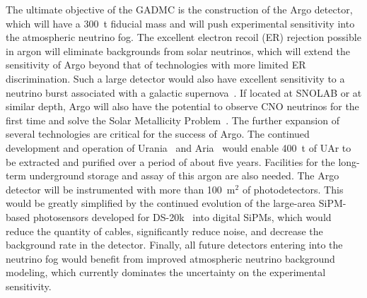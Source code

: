 The ultimate objective of the GADMC is the construction of the Argo detector, which will have a 300~t fiducial mass and will push experimental sensitivity into the atmospheric neutrino fog.  The excellent electron recoil (ER) rejection possible in argon will eliminate backgrounds from solar neutrinos, which will extend the sensitivity of Argo beyond that of technologies with more limited ER discrimination.  Such a large detector would also have excellent sensitivity to a neutrino burst associated with a galactic supernova~\cite{Agnes:2021ke}.  If located at SNOLAB or at similar depth, Argo will also have the potential to observe CNO neutrinos for the first time and solve the Solar Metallicity Problem~\cite{Agnes:2020wd,Franco:2016ex}.  The further expansion of several technologies are critical for the success of Argo. The continued development and operation of Urania~\cite{Aalseth:2018gq} and Aria~\cite{Agnes:2021us} would enable 400~t of UAr to be extracted and purified over a period of about five years. Facilities for the long-term underground storage and assay of this argon are also needed. The Argo detector will be instrumented with more than 100~m$^2$ of photodetectors. This would be greatly simplified by the continued evolution of the large-area SiPM-based photosensors developed for DS-20k~\cite{DIncecco:2018hy,DIncecco:2018fx} into digital SiPMs, which would reduce the quantity of cables, significantly reduce noise, and decrease the background rate in the detector. Finally, all future detectors entering into the neutrino fog would benefit from improved atmospheric neutrino background modeling, which currently dominates the uncertainty on the experimental sensitivity.
